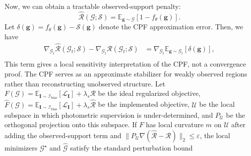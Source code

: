 \documentclass[lettersize,journal]{IEEEtran}
\begin{document}
Now, we can obtain a tractable observed-support penalty:
\begin{equation}
    \widehat{\mathcal{R}}(\mathcal{G};\mathcal{S}) = \mathbb{E}_{\mathbf{g} \sim \mathcal{G}} \left[ 1 - f_{\theta} (\mathbf{g}) \right].
    \label{eq11}
\end{equation}
Let $\delta(\mathbf{g})= f_{\theta} (\mathbf{g}) - \mathcal{S} (\mathbf{g})$ denote the CPF approximation error. Then, we have
\begin{equation}
    \begin{aligned}
    \nabla_{\mathcal{G}_t} \widehat{\mathcal{R}}(\mathcal{G}_t;\mathcal{S}) - \nabla_{\mathcal{G}_t} \mathcal{R}(\mathcal{G}_t;\mathcal{S}) &= \nabla_{\mathcal{G}_t} \mathbb{E}_{\mathbf{g} \sim \mathcal{G}_t} \left[ \delta(\mathbf{g}) \right], \\
    \end{aligned}
    \label{eq12}
\end{equation}
This term gives a local sensitivity interpretation of the CPF, not a convergence proof. The CPF serves as an approximate stabilizer for weakly observed regions rather than reconstructing unobserved structure. Let $F(\mathcal{G})=\mathbb{E}_{\mathbf{I}\sim\mathcal{I}_{\text{bias}}}[\mathcal{L}_{\mathbf{I}}]+\lambda_s\mathcal{R}$ be the ideal regularized objective, $\widehat F(\mathcal{G})=\mathbb{E}_{\mathbf{I}\sim\mathcal{I}_{\text{bias}}}[\mathcal{L}_{\mathbf{I}}]+\lambda_s\widehat{\mathcal{R}}$ be the implemented objective, $\mathcal{U}$ be the local subspace in which photometric supervision is under-determined, and $P_{\mathcal{U}}$ be the orthogonal projection onto this subspace. If $F$ has local curvature $m$ on $\mathcal{U}$ after adding the observed-support term and $\|P_{\mathcal{U}}\nabla(\widehat{\mathcal{R}}-\mathcal{R})\|_2\le \varepsilon$, the local minimizers $\mathcal{G}^{\star}$ and $\widehat{\mathcal{G}}$ satisfy the standard perturbation bound
\end{document}
